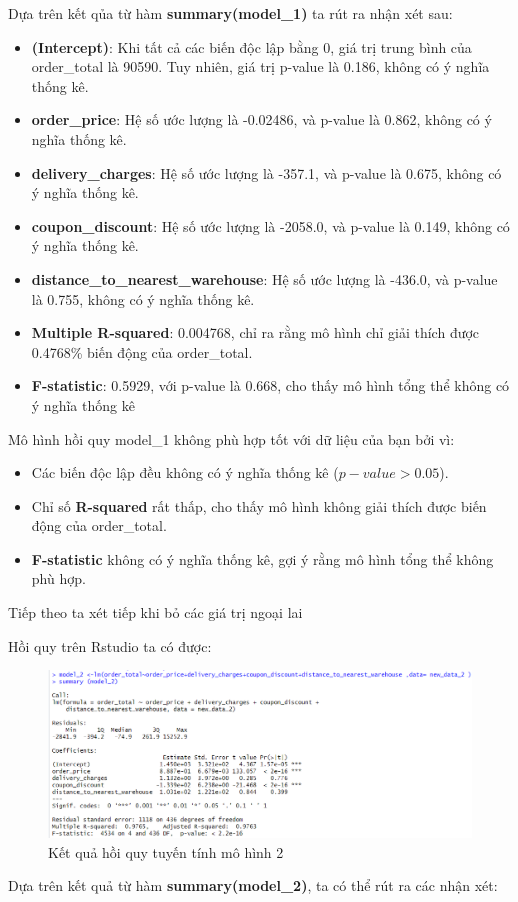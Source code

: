 Dựa trên kết qủa từ hàm \textbf{summary(model\_1)} ta rút ra nhận xét sau:
\begin{itemize}
\item \textbf{(Intercept)}: Khi tất cả các biến độc lập bằng 0, giá trị trung bình của order\_total là 90590. Tuy nhiên, giá trị p-value là 0.186, không có ý nghĩa thống kê.
\item \textbf{order\_price}: Hệ số ước lượng là -0.02486, và p-value là 0.862, không có ý nghĩa thống kê.
\item \textbf{delivery\_charges}: Hệ số ước lượng là -357.1, và p-value là 0.675, không có ý nghĩa thống kê.
\item \textbf{coupon\_discount}: Hệ số ước lượng là -2058.0, và p-value là 0.149, không có ý nghĩa thống kê.
\item \textbf{distance\_to\_nearest\_warehouse}: Hệ số ước lượng là -436.0, và p-value là 0.755, không có ý nghĩa thống kê.
\item\textbf{Multiple R-squared}: 0.004768, chỉ ra rằng mô hình chỉ giải thích được 0.4768\% biến động của order\_total.
\item\textbf{F-statistic}: 0.5929, với p-value là 0.668, cho thấy mô hình tổng thể không có ý nghĩa thống kê
\end{itemize}
Mô hình hồi quy model\_1 không phù hợp tốt với dữ liệu của bạn bởi vì:
\begin{itemize}
\item Các biến độc lập đều không có ý nghĩa thống kê ($p-value > 0.05$).
\item Chỉ số \textbf{R-squared} rất thấp, cho thấy mô hình không giải thích được biến động của order\_total.
\item\textbf{F-statistic} không có ý nghĩa thống kê, gợi ý rằng mô hình tổng thể không phù hợp.
\end{itemize}

Tiếp theo ta xét tiếp khi bỏ các giá trị ngoại lai

Hồi quy trên Rstudio ta có được:
\begin{figure}[!htp]
  \centering
  \includegraphics[width=0.7\linewidth]{graphics/5.5.3.png}
  \caption{Kết quả hồi quy tuyến tính mô hình 2 }
\end{figure} 
\newpage
Dựa trên kết quả từ hàm \textbf{summary(model\_2)}, ta có thể rút ra các nhận xét:


